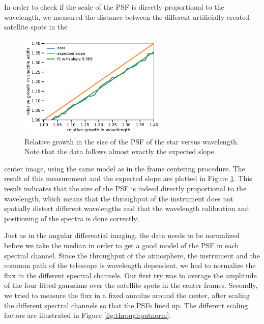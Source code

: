 \documentclass[twoside,single,12pt]{lion-msc}
\begin{document}
In order to check if the scale of the PSF is directly proportional to the wavelength, we measured the distance between the different artificially created satellite spots in the 
{\par}

\begin{figure}
\centering
\vspace{-0.5cm}
\includegraphics[width = 0.63\textwidth]{specklegrowth}
\caption{Relative growth in the size of the PSF of the star versus wavelength. Note that the data follows almost exactly the expected slope.}
\label{fig:specklegrowth}
\vspace{-1.5cm}
\end{figure}

\noindent
center image, using the same model as in the frame centering procedure. The result of this measurement and the expected slope are plotted in Figure \ref{fig:specklegrowth}. This result indicates that the size of the PSF is indeed directly proportional to the wavelength, which means that the throughput of the instrument does not spatially distort different wavelengths and that the wavelength calibration and positioning of the spectra is done correctly.
\bigskip

Just as in the angular differential imaging, the data needs to be normalized before we take the median in order to get a good model of the PSF in each spectral channel. Since the throughput of the atmosphere, the instrument and the common path of the telescope is wavelength dependent, we had to normalize the flux in the different spectral channels. Our first try was to average the amplitude of the four fitted gaussians over the satellite spots in the center frames. Secondly, we tried to measure the flux in a fixed annulus around the center, after scaling the different spectral channels so that the PSFs lined up. The different scaling factors are illustrated in Figure \ref{fig:throughputnorm}.
\bigskip
\end{document}
